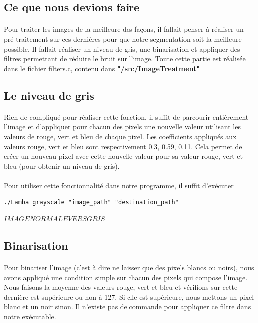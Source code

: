\documentclass{article}
\begin{document}
\subsection{Ce que nous devions faire}

\paragraph{}Pour traiter les images de la meilleure des façons, il fallait penser à réaliser un pré traitement sur ces dernières pour que notre segmentation soit la meilleure possible. Il fallait réaliser un niveau de gris, une binarisation et appliquer des filtres permettant de réduire le bruit sur l'image. Toute cette partie est réalisée dans le fichier filters.c, contenu dans \textbf{"/src/ImageTreatment"}

\subsection{Le niveau de gris}

\paragraph{}Rien de compliqué pour réaliser cette fonction, il suffit de parcourir entièrement l'image et d'appliquer pour chacun des pixels une nouvelle valeur utilisant les valeurs de rouge, vert et bleu de chaque pixel. Les coefficients appliqués aux valeurs rouge, vert et bleu sont respectivement 0.3, 0.59, 0.11. Cela permet de créer un nouveau pixel avec cette nouvelle valeur pour sa valeur rouge, vert et bleu (pour obtenir un niveau de gris).

\paragraph{}Pour utiliser cette fonctionnalité dans notre programme, il suffit d'exécuter
\begin{lstlisting}
./Lamba grayscale "image_path" "destination_path"
\end{lstlisting}

$ IMAGE NORMALE VERS GRIS $

\subsection{Binarisation}

\paragraph{}Pour binariser l'image (c'est à dire ne laisser que des pixels blancs ou noirs), nous avons appliqué une condition simple sur chacun des pixels qui compose l'image. Nous faisons la moyenne des valeurs rouge, vert et bleu et vérifions sur cette dernière est supérieure ou non à 127. Si elle est supérieure, nous mettons un pixel blanc et un noir sinon. Il n'existe pas de commande pour appliquer ce filtre dans notre exécutable.
\end{document}
